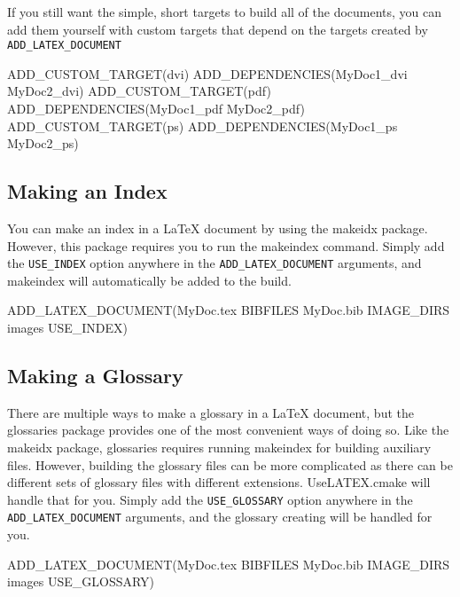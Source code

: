 \documentclass{article}
\newcommand*{\textfile}[1]{\textsf{#1}}
\newcommand*{\textprog}[1]{\textfile{#1}}
\newcommand*{\textlatexpackage}[1]{\textsf{#1}}
\newcommand*{\textcmake}[1]{\texttt{#1}}
\newcommand*{\UseLATEX}{\textfile{UseLATEX.cmake}\xspace}
\newcommand*{\latex}{\LaTeX\xspace}
\newcommand*{\ald}{\textcmake{ADD\_LATEX\_DOCUMENT}\xspace}
\begin{document}
  If you still want the simple, short targets to build all of the
  documents, you can add them yourself with custom targets that depend on
  the targets created by \ald

  \begin{CodeListing}
ADD_CUSTOM_TARGET(dvi)
ADD_DEPENDENCIES(MyDoc1_dvi MyDoc2_dvi)
ADD_CUSTOM_TARGET(pdf)
ADD_DEPENDENCIES(MyDoc1_pdf MyDoc2_pdf)
ADD_CUSTOM_TARGET(ps)
ADD_DEPENDENCIES(MyDoc1_ps MyDoc2_ps)
  \end{CodeListing}

  \subsection{Making an Index}
  \label{sec:MakingAnIndex}

  You can make an index in a \latex document by using the
  \textlatexpackage{makeidx} package. However, this package requires you to
  run the \textprog{makeindex} command. Simply add the
  \textcmake{USE\_INDEX} option anywhere in the \ald arguments, and
  \textprog{makeindex} will automatically be added to the build.

  \begin{CodeListing}
ADD_LATEX_DOCUMENT(MyDoc.tex BIBFILES MyDoc.bib
                   IMAGE_DIRS images
		   USE_INDEX)
  \end{CodeListing}

  \subsection{Making a Glossary}
  \label{sec:MakingAGlossary}

  There are multiple ways to make a glossary in a \latex document, but the
  \textlatexpackage{glossaries} package provides one of the most convenient
  ways of doing so.  Like the \textlatexpackage{makeidx} package,
  \textlatexpackage{glossaries} requires running \textprog{makeindex} for
  building auxiliary files.  However, building the glossary files can be
  more complicated as there can be different sets of glossary files with
  different extensions.  \UseLATEX will handle that for you.  Simply add
  the \textcmake{USE\_GLOSSARY} option anywhere in the \ald arguments, and
  the glossary creating will be handled for you.

  \begin{CodeListing}
ADD_LATEX_DOCUMENT(MyDoc.tex BIBFILES MyDoc.bib
                   IMAGE_DIRS images
		   USE_GLOSSARY)
  \end{CodeListing}
\end{document}
